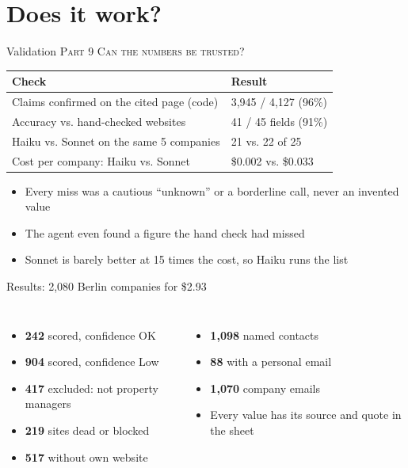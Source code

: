 \documentclass[aspectratio=169,11pt]{beamer}
\newcommand{\partlabel}[1]{{\small\color{assume}\textsc{#1}}\par\vspace{0.3em}}
\begin{document}
\section{Does it work?}

\begin{frame}{Validation}
  \partlabel{Part 9 \textbullet{} Can the numbers be trusted?}
  \begin{tabular}{@{}p{8.0cm} p{4.8cm}@{}}
    \toprule
    \textbf{Check} & \textbf{Result} \\
    \midrule
    Claims confirmed on the cited page (code) & 3,945 / 4,127 (96\%) \\
    Accuracy vs. hand-checked websites & 41 / 45 fields (91\%) \\
    Haiku vs. Sonnet on the same 5 companies & 21 vs. 22 of 25 \\
    Cost per company: Haiku vs. Sonnet & \$0.002 vs. \$0.033 \\
    \bottomrule
  \end{tabular}
  \vspace{0.6em}
  \begin{itemize}
    \item Every miss was a cautious ``unknown'' or a borderline call, never an invented value
    \item The agent even found a figure the hand check had missed
    \item Sonnet is barely better at 15 times the cost, so Haiku runs the list
  \end{itemize}
\end{frame}

\begin{frame}{Results: 2,080 Berlin companies for \$2.93}
  \begin{columns}[T]
    \begin{itemize}
      \item \textbf{242} scored, confidence OK
      \item \textbf{904} scored, confidence Low
      \item \textbf{417} excluded: not property managers
      \item \textbf{219} sites dead or blocked
      \item \textbf{517} without own website
    \end{itemize}
    \begin{itemize}
      \item \textbf{1,098} named contacts
      \item \textbf{88} with a personal email
      \item \textbf{1,070} company emails
      \item Every value has its source and quote in the sheet
    \end{itemize}
  \end{columns}
\end{frame}
\end{document}
